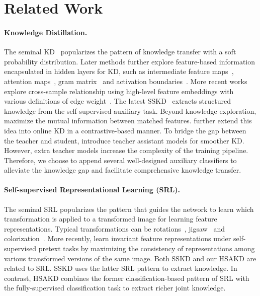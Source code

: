 \documentclass{article}
\begin{document}
\section{Related Work}
\paragraph{Knowledge Distillation.} The seminal KD~\cite{hinton2015distilling} popularizes the pattern of knowledge transfer with a soft probability distribution. Later methods further explore feature-based information encapsulated in hidden layers for KD, such as intermediate feature maps~\cite{romero2014fitnets}, attention maps~\cite{zagoruyko2016paying}, gram matrix~\cite{Gift17} and activation boundaries~\cite{heo2019knowledge}. More recent works explore cross-sample relationship using high-level feature embeddings with various definitions of edge weight~\cite{park2019relational,peng2019correlation,Tung2019Similarity}. The latest SSKD~\cite{DBLP:conf/eccv/XuLLL20} extracts structured knowledge from the self-supervised auxiliary task. Beyond knowledge exploration, \cite{Sungsoo19Variational,tian2019contrastive} maximize the mutual information between matched features. \cite{yang2021multi} further extend this idea into online KD in a contrastive-based manner. To bridge the gap between the teacher and student, \cite{passalis2020heterogeneous} introduce teacher assistant models for smoother KD. However, extra teacher models increase the complexity of the training pipeline. Therefore, we choose to append several well-designed auxiliary classifiers to alleviate the knowledge gap and facilitate comprehensive knowledge transfer.
\paragraph{Self-supervised Representational Learning (SRL).} The seminal SRL popularizes the pattern that guides the network to learn which transformation is applied to a transformed image for learning feature representations. Typical transformations can be rotations~\cite{Spyros2018Unsupervised}, jigsaw~\cite{noroozi2016unsupervised} and colorization~\cite{zhang2016colorful}. More recently, \cite{misra2020self,chen2020simple} learn invariant feature representations under self-supervised pretext tasks by maximizing the consistency of representations among various transformed versions of the same image. Both SSKD and our HSAKD are related to SRL. SSKD uses the latter SRL pattern to extract knowledge. In contrast, HSAKD combines the former classification-based pattern of SRL with the fully-supervised classification task to extract richer joint knowledge.
\end{document}
